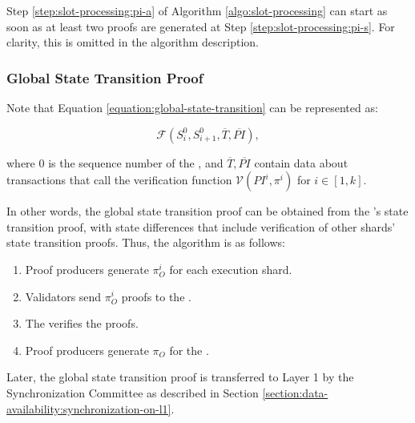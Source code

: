\begin{remark}
    Step \ref{step:slot-processing:pi-a} of Algorithm \ref{algo:slot-processing} 
     can start as soon as at least two proofs are generated at Step \ref{step:slot-processing:pi-s}. 
     For clarity, this is omitted in the algorithm description.
\end{remark}

\subsubsection{Global State Transition Proof}

Note that Equation \ref{equation:global-state-transition} 
 can be represented as:

\[
    \mathcal{F}(S^0_i, S^0_{i + 1}, \overline{T}, \overline{PI}),
\]

where $0$ is the sequence number of the \mainshard, 
 and $\overline{T}, \overline{PI}$ contain data about transactions 
 that call the verification function $\mathcal{V}(PI^i, \pi^i)$
 for $i \in [1, k]$.

In other words, the global state transition proof can be obtained from 
 the \mainshard's state transition proof, 
 with state differences that include verification of other shards' state transition proofs. 
Thus, the algorithm is as follows:
\begin{enumerate}
    \item Proof producers generate $\pi^i_O$ for each execution shard. 
    \item Validators send $\pi^i_O$ proofs to the \mainshard.
    \item The \mainshard verifies the proofs. 
    \item Proof producers generate $\pi_O$ for the \mainshard.
\end{enumerate}

Later, the global state transition proof is transferred to Layer 1
 by the Synchronization Committee as described in Section \ref{section:data-availability:synchronization-on-l1}.
